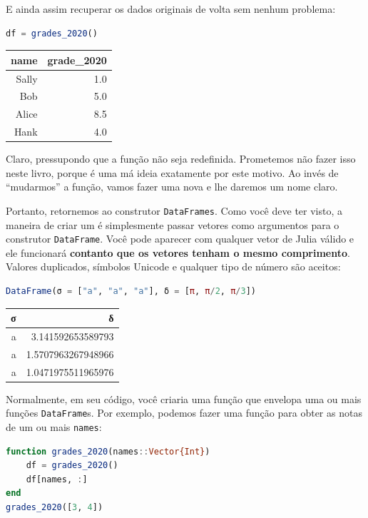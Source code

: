 \documentclass[
  notoc %
]{tufte-book}
\newcommand{\passthrough}[1]{#1}
\begin{document}
E ainda assim recuperar os dados originais de volta sem nenhum problema:

\begin{lstlisting}[language=Julia]
df = grades_2020()
\end{lstlisting}

\begin{longtable}[]{@{}rr@{}}
\toprule
name & grade\_2020 \\
\midrule
\endhead
Sally & 1.0 \\
Bob & 5.0 \\
Alice & 8.5 \\
Hank & 4.0 \\
\bottomrule
\end{longtable}

Claro, pressupondo que a função não seja redefinida. Prometemos não
fazer isso neste livro, porque é uma má ideia exatamente por este
motivo. Ao invés de ``mudarmos'' a função, vamos fazer uma nova e lhe
daremos um nome claro.

Portanto, retornemos ao construtor \passthrough{\lstinline!DataFrames!}.
Como você deve ter visto, a maneira de criar um é simplesmente passar
vetores como argumentos para o construtor
\passthrough{\lstinline!DataFrame!}. Você pode aparecer com qualquer
vetor de Julia válido e ele funcionará \textbf{contanto que os vetores
tenham o mesmo comprimento}. Valores duplicados, símbolos Unicode e
qualquer tipo de número são aceitos:

\begin{lstlisting}[language=Julia]
DataFrame(σ = ["a", "a", "a"], δ = [π, π/2, π/3])
\end{lstlisting}

\begin{longtable}[]{@{}rr@{}}
\toprule
σ & δ \\
\midrule
\endhead
a & 3.141592653589793 \\
a & 1.5707963267948966 \\
a & 1.0471975511965976 \\
\bottomrule
\end{longtable}

Normalmente, em seu código, você criaria uma função que envelopa uma ou
mais funções \passthrough{\lstinline!DataFrame!}s. Por exemplo, podemos
fazer uma função para obter as notas de um ou mais
\passthrough{\lstinline!names!}:

\begin{lstlisting}[language=Julia]
function grades_2020(names::Vector{Int})
    df = grades_2020()
    df[names, :]
end
grades_2020([3, 4])
\end{lstlisting}
\end{document}
